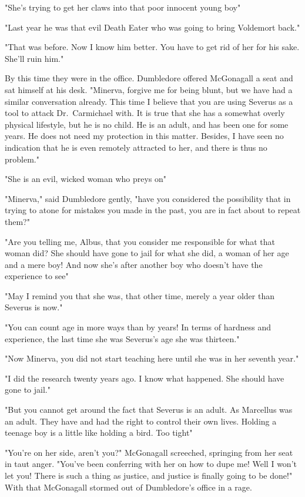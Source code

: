 "She's trying to get her claws into that poor innocent young boy{\el}"

"Last year he was that evil Death Eater who was going to bring Voldemort back."

"That was before. Now I know him better. You have to get rid of her for his sake. She'll ruin him."

By this time they were in the office. Dumbledore offered McGonagall a seat and sat himself at his desk. "Minerva, forgive me for being blunt, but we have had a similar conversation already. This time I believe that you are using Severus as a tool to attack Dr.~Carmichael with. It is true that she has a somewhat overly physical lifestyle, but he is no child. He is an adult, and has been one for some years. He does not need my protection in this matter. Besides, I have seen no indication that he is even remotely attracted to her, and there is thus no problem."

"She is an evil, wicked woman who preys on{\el}"

"Minerva," said Dumbledore gently, "have you considered the possibility that in trying to atone for mistakes you made in the past, you are in fact about to repeat them?"

"Are you telling me, Albus, that you consider me responsible for what that woman did? She should have gone to jail for what she did, a woman of her age and a mere boy! And now she's after another boy who doesn't have the experience to see{\el}"

"May I remind you that she was, that other time, merely a year older than Severus is now."

"You can count age in more ways than by years! In terms of hardness and experience, the last time she was Severus's age she was thirteen."

"Now Minerva, you did not start teaching here until she was in her seventh year."

"I did the research twenty years ago. I know what happened. She should have gone to jail."

"But you cannot get around the fact that Severus is an adult. As Marcellus was an adult. They have and had the right to control their own lives. Holding a teenage boy is a little like holding a bird. Too tight{\el}"

"You're on her side, aren't you?" McGonagall screeched, springing from her seat in taut anger. "You've been conferring with her on how to dupe me! Well I won't let you! There is such a thing as justice, and justice is finally going to be done!" With that McGonagall stormed out of Dumbledore's office in a rage.

